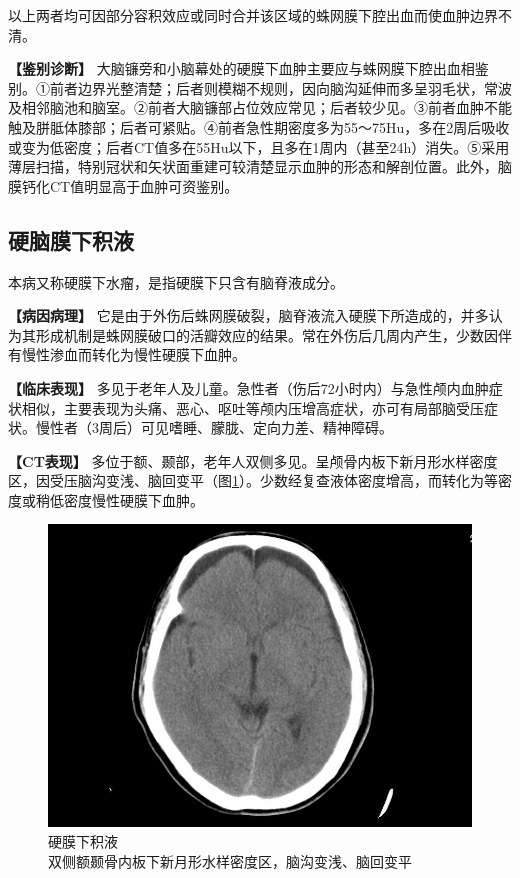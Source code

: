 以上两者均可因部分容积效应或同时合并该区域的蛛网膜下腔出血而使血肿边界不清。

\textbf{【鉴别诊断】}
大脑镰旁和小脑幕处的硬膜下血肿主要应与蛛网膜下腔出血相鉴别。①前者边界光整清楚；后者则模糊不规则，因向脑沟延伸而多呈羽毛状，常波及相邻脑池和脑室。②前者大脑镰部占位效应常见；后者较少见。③前者血肿不能触及胼胝体膝部；后者可紧贴。④前者急性期密度多为55～75Hu，多在2周后吸收或变为低密度；后者CT值多在55Hu以下，且多在1周内（甚至24h）消失。⑤采用薄层扫描，特别冠状和矢状面重建可较清楚显示血肿的形态和解剖位置。此外，脑膜钙化CT值明显高于血肿可资鉴别。

\subsection{硬脑膜下积液}

本病又称硬膜下水瘤，是指硬膜下只含有脑脊液成分。

\textbf{【病因病理】}
它是由于外伤后蛛网膜破裂，脑脊液流入硬膜下所造成的，并多认为其形成机制是蛛网膜破口的活瓣效应的结果。常在外伤后几周内产生，少数因伴有慢性渗血而转化为慢性硬膜下血肿。

\textbf{【临床表现】}
多见于老年人及儿童。急性者（伤后72小时内）与急性颅内血肿症状相似，主要表现为头痛、恶心、呕吐等颅内压增高症状，亦可有局部脑受压症状。慢性者（3周后）可见嗜睡、朦胧、定向力差、精神障碍。

\textbf{【CT表现】}
多位于额、颞部，老年人双侧多见。呈颅骨内板下新月形水样密度区，因受压脑沟变浅、脑回变平（图\ref{fig2-33}）。少数经复查液体密度增高，而转化为等密度或稍低密度慢性硬膜下血肿。

\begin{figure}[!htbp]
 \centering
 \includegraphics[width=.7\textwidth,height=\textheight,keepaspectratio]{./images/Image00054.jpg}
 \captionsetup{justification=centering}
 \caption{硬膜下积液\\{\small 双侧额颞骨内板下新月形水样密度区，脑沟变浅、脑回变平}}
 \label{fig2-33}
  \end{figure} 

